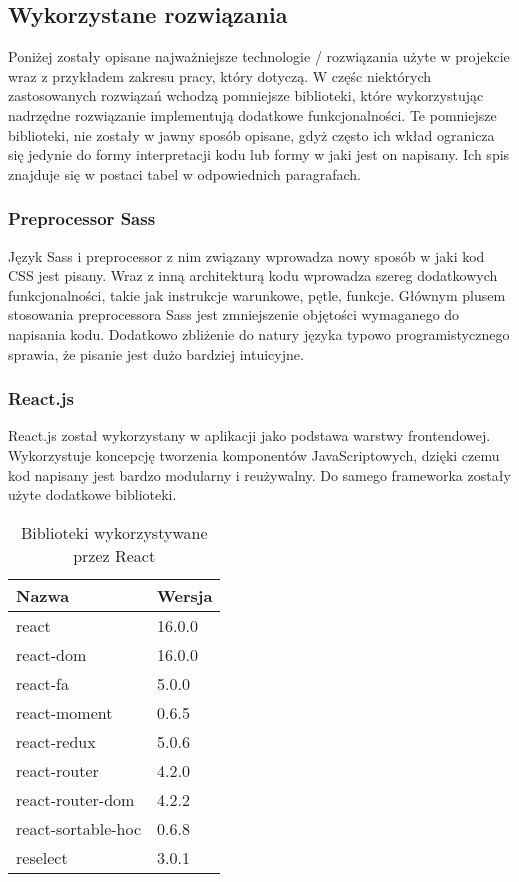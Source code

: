 \documentclass[eng,printmode]{mgr}
\begin{document}
\subsection{Wykorzystane rozwiązania}

Poniżej zostały opisane najważniejsze technologie / rozwiązania użyte w projekcie wraz z przykładem zakresu pracy, który dotyczą. W częśc niektórych zastosowanych rozwiązań wchodzą pomniejsze biblioteki, które wykorzystując nadrzędne rozwiązanie implementują dodatkowe funkcjonalności. Te pomniejsze biblioteki, nie zostały w jawny sposób opisane, gdyż często ich wkład ogranicza się jedynie do formy interpretacji kodu lub formy w jaki jest on napisany. Ich spis znajduje się w postaci tabel w odpowiednich paragrafach.

\subsubsection{Preprocessor Sass}
Język Sass i preprocessor z nim związany \cite {Sass} wprowadza nowy sposób w jaki kod CSS jest pisany. Wraz z inną architekturą kodu wprowadza szereg dodatkowych funkcjonalności, takie jak instrukcje warunkowe, pętle, funkcje. Głównym plusem stosowania preprocessora Sass jest zmniejszenie objętości wymaganego do napisania kodu. Dodatkowo zbliżenie do natury języka typowo programistycznego sprawia, że pisanie jest dużo bardziej intuicyjne.

\subsubsection{React.js}
React.js \cite {React} został wykorzystany w aplikacji jako podstawa warstwy frontendowej. Wykorzystuje koncepcję tworzenia komponentów JavaScriptowych, dzięki czemu kod napisany jest bardzo modularny i reużywalny. Do samego frameworka zostały użyte dodatkowe biblioteki.

\begin{table}[H]
\begin{tabularx}{\textwidth}{|X|X|}
  \hline
    \textbf{Nazwa} & \textbf{Wersja} \\
  \hline
    react & 16.0.0 \\
  \hline
   	react-dom & 16.0.0 \\
  \hline
  	react-fa & 5.0.0 \\
   \hline
   	react-moment & 0.6.5 \\
   \hline
  	react-redux & 5.0.6 \\
   \hline
  	react-router & 4.2.0 \\
   \hline
  	react-router-dom & 4.2.2 \\
   \hline
  	react-sortable-hoc & 0.6.8 \\
   \hline
   reselect & 3.0.1 \\
   \hline
\end{tabularx}
\caption{Biblioteki wykorzystywane przez React}
\end{table}
\end{document}
